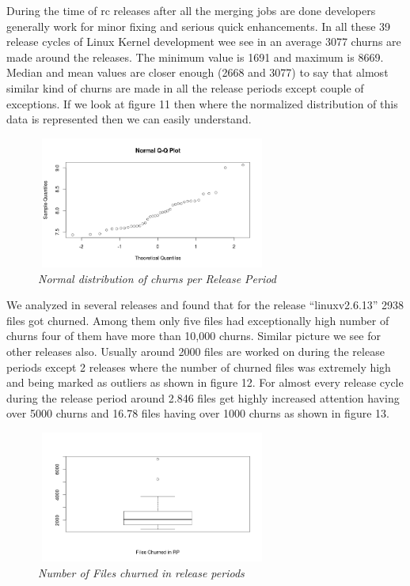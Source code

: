 \documentclass{acm_proc_article-sp}
\begin{document}
During the time of rc releases after all the merging jobs are done developers generally work for minor fixing and serious quick enhancements. In all these 39 release cycles of Linux Kernel development wee see in an average 3077 churns are made around the releases. The minimum value is 1691 and maximum is 8669. Median and mean values are closer enough (2668 and 3077) to say that almost similar kind of churns are made in all the release periods except couple of exceptions. If we look at figure 11 then where the normalized distribution of this data is represented then we can easily understand.
\begin{figure}
\begin{center}
\includegraphics[height=1.7in,width=3in]{churnRPnorm.png}
\caption{\small \sl Normal distribution of churns per Release Period}
\end{center}
\end{figure}

We analyzed in several releases and found that for the release ``linuxv2.6.13'' 2938 files got churned. Among them only five files had exceptionally high number of churns four of them have more than 10,000 churns. Similar picture we see for other releases also. Usually around 2000 files are worked on during the release periods except 2 releases where the number of churned files was extremely high and being marked as outliers as shown in figure 12. For almost every release cycle during the release period around 2.846 files get highly increased attention having over 5000 churns and 16.78 files having over 1000 churns as shown in figure 13.
\begin{figure}
\begin{center}
\includegraphics[height=1.7in,width=3in]{fileChurnRPbox.png}
\caption{\small \sl Number of Files churned in release periods}
\end{center}
\end{figure}
\end{document}
